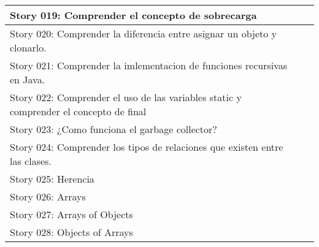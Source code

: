 \documentclass{article}
\begin{document}
\begin{center}
\begin{tabular}{ | p{11cm} | p{2cm} | p{2cm} | }
    \hline
    Story 019: Comprender el concepto de sobrecarga &   & \\ 
    \hline
    Story 020: Comprender la diferencia entre asignar un objeto y clonarlo. &  &  \\ 
    \hline
    Story 021: Comprender la imlementacion de funciones recursivas en Java. &   & \\ 
    \hline
    Story 022: Comprender el uso de las variables static y comprender el concepto de final &   & \\ 
    \hline
    Story 023: ¿Como funciona el garbage collector? &   & \\ 
    \hline
    Story 024: Comprender los tipos de relaciones que existen entre las clases. &  &  \\ 
    \hline
    Story 025: Herencia &   & \\ 
    \hline
    Story 026: Arrays &   & \\ 
    \hline
    Story 027: Arrays of Objects &  &  \\ 
    \hline
    Story 028: Objects of Arrays &  & \\ 
    \hline 
    \end{tabular}
    \end{center}
\end{document}
